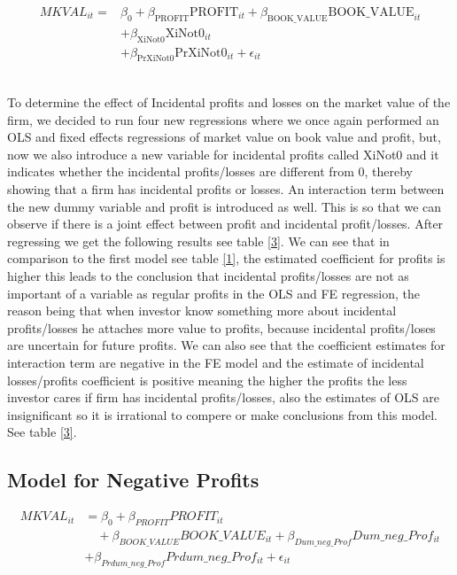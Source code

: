 \documentclass[11pt, letterpaper]{article}
\begin{document}
\begin{equation}
\begin{split}
MKVAL_{it} = & \beta_{0} + \beta_{\text{PROFIT}} \text{PROFIT}_{it} + \beta_{\text{BOOK\_VALUE}} \text{BOOK\_VALUE}_{it} \\
          & + \beta_{\text{XiNot0}} \text{XiNot0}_{it} \\
          & + \beta_{\text{PrXiNot0}} \text{PrXiNot0}_{it} + \epsilon_{it}
\end{split}
\end{equation}\

To determine the effect of Incidental profits and losses on the market value of the firm, we decided to run four new regressions where we once again performed an OLS and fixed effects regressions of market value on book value and profit, but, now we also introduce  a new variable for incidental profits called XiNot0 and it indicates whether the incidental profits/losses are different from 0, thereby showing that a firm has incidental profits or losses. An interaction term between the new dummy variable and profit is introduced as well. This is so that we can observe if there is a joint effect between profit and incidental profit/losses. After regressing  we get the following results see table \ref{3}. We can see that in comparison to the first model see table \ref{1}, the estimated coefficient for profits is  higher this leads to the conclusion that incidental profits/losses are not as important of a variable as regular profits in the OLS and FE regression, the reason being that when investor know something more about incidental profits/losses he attaches more value to profits, because incidental profits/loses are uncertain for future profits. We can also see that the coefficient estimates for interaction term are negative in the FE model and the estimate of incidental losses/profits coefficient is positive meaning the higher the profits the less investor cares if firm has incidental profits/losses, also the estimates of OLS are insignificant so it is irrational to compere or make conclusions from this model. See table  \ref{3}. 


\subsection{Model for Negative Profits}

\begin{align*}
    MKVAL_{it} &= \beta_{0} + \beta_{PROFIT}PROFIT_{it} \\
    &\quad + \beta_{BOOK\_VALUE}BOOK\_VALUE_{it} + \beta_{Dum\_neg\_Prof}Dum\_neg\_Prof_{it} \\    &+ \beta_{Prdum\_neg\_Prof}Prdum\_neg\_Prof_{it} + \epsilon_{it}
\end{align*}
\end{document}
